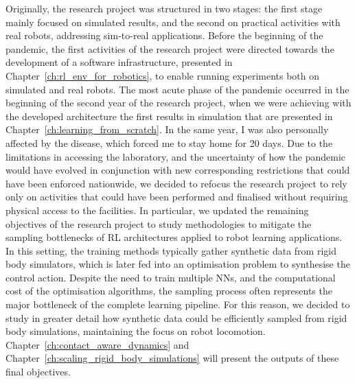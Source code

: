 Originally, the research project was structured in two stages: the first stage mainly focused on simulated results, and the second on practical activities with real robots, addressing sim-to-real applications.
Before the beginning of the pandemic, the first activities of the research project were directed towards the development of a software infrastructure, presented in Chapter~\ref{ch:rl_env_for_robotics}, to enable running experiments both on simulated and real robots.
The most acute phase of the pandemic occurred in the beginning of the second year of the research project, when we were achieving with the developed architecture the first results in simulation that are presented in Chapter~\ref{ch:learning_from_scratch}.
In the same year, I was also personally affected by the disease, which forced me to stay home for 20 days.
Due to the limitations in accessing the laboratory, and the uncertainty of how the pandemic would have evolved in conjunction with new corresponding restrictions that could have been enforced nationwide, we decided to refocus the research project to rely only on activities that could have been performed and finalised without requiring physical access to the facilities.
In particular, we updated the remaining objectives of the research project to study methodologies to mitigate the sampling bottlenecks of \acl{RL} architectures applied to robot learning applications.
In this setting, the training methods typically gather synthetic data from rigid body simulators, which is later fed into an optimisation problem to synthesise the control action.
Despite the need to train multiple \aclp{NN}, and the computational cost of the optimisation algorithms, the sampling process often represents the major bottleneck of the complete learning pipeline.
For this reason, we decided to study in greater detail how synthetic data could be efficiently sampled from rigid body simulations, maintaining the focus on robot locomotion.
Chapter~\ref{ch:contact_aware_dynamics} and Chapter~\ref{ch:scaling_rigid_body_simulations} will present the outputs of these final objectives.
